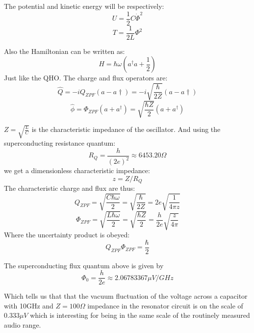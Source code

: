 \documentclass[12pt]{article}
\numberwithin{equation}{subsection}
\newcommand\ask[1]{
{%
}
}
\newcommand\page[1]{
{
}
}
\begin{document}
The potential and kinetic energy will be respectively:
\begin{equation}
    U=\frac{1}{2}C\dot\Phi^2
\end{equation}
\begin{equation}
    T = \frac{1}{2L} \Phi^2
\end{equation}
\page{11}
Also the Hamiltonian can be written as:
\begin{equation}
    H= \hbar\omega(a^\dagger a + \frac{1}{2})
\end{equation}
Just like the QHO.
The charge and flux operators are:
\begin{equation}
    \hat Q = - i Q_{ZPF} (a-a \dagger) = - i \sqrt{\frac{\hbar}{2Z}} (a-a \dagger)
\end{equation}
\begin{equation}
    \hat \phi = \Phi_{ZPF} (a+a^\dagger)=  \sqrt{\frac{\hbar Z}{2}}(a+a^\dagger)
\end{equation}

\page{12}
$Z=\sqrt{\frac{L}{C}}$ is the characteristic impedance of the oscillator.
And using the superconducting resistance quantum:
\begin{equation}
    R_Q=\frac{h}{(2e)^2} \approx 6453.20 \Omega
\end{equation}
we get a dimensionless characteristic impedance:
\begin{equation}
    z= Z/R_Q
\end{equation}
The characteristic charge and flux are thus:
\begin{equation}
    Q_{ZPF}= \sqrt{\frac{C\hbar \omega }{2}} = \sqrt{\frac{\hbar}{2Z}} =2e \sqrt{\frac{1}{4\pi z}}
\end{equation}
\begin{equation}
    \Phi_{ZPF}= \sqrt{\frac{L\hbar \omega }{2}} = \sqrt{\frac{\hbar Z}{2}}=\frac{h}{2e} \sqrt{\frac{z}{4\pi }}
\end{equation}
Where the uncertainty product is obeyed:
\begin{equation}
   Q_{ZPF}\Phi_{ZPF} = \frac{\hbar}{2} 
\end{equation}

The superconducting flux quantum above is given by 
\begin{equation}
    \Phi_0 = \frac{h}{2e} \approx 2.06783367 \mu V/GHz
\end{equation}
\page{13}
Which tells us that that the vacuum fluctuation of the voltage across a capacitor with 10GHz and $Z=100\Omega$ impedance in the resonator circuit is on the scale of $0.333\mu V$ which is interesting for being in the same scale of the routinely measured audio range. 
\ask{what audio range?}
\page{15}
\end{document}
